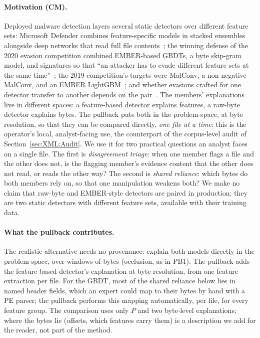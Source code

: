 \paragraph{Motivation (CM).} Deployed malware detection layers several static detectors over different feature sets: Microsoft Defender combines feature-specific models in stacked ensembles alongside deep networks that read full file contents~\cite{microsoft2019insideout}; the winning defense of the 2020 evasion competition combined EMBER-based GBDTs, a byte skip-gram model, and signatures so that ``an attacker has to evade different feature sets at the same time''~\cite{quiring2020against}; the 2019 competition's targets were MalConv, a non-negative MalConv, and an EMBER LightGBM~\cite{endgame2019mlsec}; and whether evasions crafted for one detector transfer to another depends on the pair~\cite{salman2024robustness}. The members' explanations live in different spaces: a feature-based detector explains features, a raw-byte detector explains bytes. The pullback puts both in the problem-space, at byte resolution, so that they can be compared directly, \emph{one file at a time}: this is the operator's local, analyst-facing use, the counterpart of the corpus-level audit of Section~\ref{sec:XML:Audit}. We use it for two practical questions an analyst faces on a single file. The first is \textit{disagreement triage}: when one member flags a file and the other does not, is the flagging member's evidence content that the other does not read, or reads the other way? The second is \textit{shared reliance}: which bytes do both members rely on, so that one manipulation weakens both? We make no claim that raw-byte and EMBER-style detectors are paired in production; they are two static detectors with different feature sets, available with their training data.

\paragraph{What the pullback contributes.} The realistic alternative needs no provenance: explain both models directly in the problem-space, over windows of bytes (occlusion, as in PB1). The pullback adds the feature-based detector's explanation at byte resolution, from one feature extraction per file. For the GBDT, most of the shared reliance below lies in named header fields, which an expert could map to their bytes by hand with a PE parser; the pullback performs this mapping automatically, per file, for every feature group. The comparison uses only $P$ and two byte-level explanations; where the bytes lie (offsets, which features carry them) is a description we add for the reader, not part of the method.

